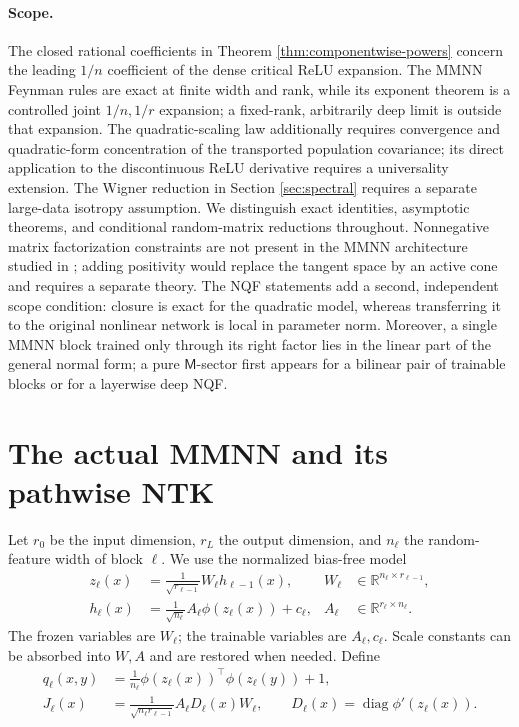 \documentclass{article}
\newcommand{\R}{\mathbb R}
\newcommand{\diag}{\operatorname{diag}}
\begin{document}
\paragraph{Scope.}
The closed rational coefficients in Theorem
\ref{thm:componentwise-powers} concern the leading \(1/n\) coefficient of
the dense critical ReLU expansion.  The MMNN Feynman rules are exact at
finite width and rank, while its exponent theorem is a controlled joint
\(1/n,1/r\) expansion; a fixed-rank, arbitrarily deep limit is outside that
expansion.  The quadratic-scaling law additionally requires convergence and
quadratic-form concentration of the transported population covariance; its
direct application to the discontinuous ReLU derivative requires a
universality extension.  The Wigner reduction in Section \ref{sec:spectral}
requires a separate large-data isotropy assumption.  We distinguish exact
identities, asymptotic theorems, and conditional random-matrix reductions
throughout.  Nonnegative matrix factorization constraints are not present in
the MMNN architecture studied in \citep{MMNN2024}; adding positivity would
replace the tangent space by an active cone and requires a separate theory.
The NQF statements add a second, independent scope condition: closure is
exact for the quadratic model, whereas transferring it to the original
nonlinear network is local in parameter norm.  Moreover, a single MMNN block
trained only through its right factor lies in the linear part of the general
normal form; a pure \(\mathsf M\)-sector first appears for a bilinear pair of
trainable blocks or for a layerwise deep NQF.

\section{The actual MMNN and its pathwise NTK}
\label{sec:mmnn}

Let \(r_0\) be the input dimension, \(r_L\) the output dimension, and
\(n_\ell\) the random-feature width of block \(\ell\).  We use the normalized
bias-free model
\begin{align}
z_\ell(x)&=\frac{1}{\sqrt{r_{\ell-1}}}W_\ell h_{\ell-1}(x),
&W_\ell&\in\R^{n_\ell\times r_{\ell-1}},\label{eq:mmnn-z}\\
h_\ell(x)&=\frac{1}{\sqrt{n_\ell}}A_\ell\phi(z_\ell(x))+c_\ell,
&A_\ell&\in\R^{r_\ell\times n_\ell}.
\label{eq:mmnn-h}
\end{align}
The frozen variables are \(W_\ell\); the trainable variables are
\(A_\ell,c_\ell\).  Scale constants can be absorbed into \(W,A\) and are
restored when needed.  Define
\begin{align}
q_\ell(x,y)&=\frac1{n_\ell}
\phi(z_\ell(x))^\top\phi(z_\ell(y))+1,\label{eq:q-direct}\\
J_\ell(x)&=\frac{1}{\sqrt{n_\ell r_{\ell-1}}}
A_\ell D_\ell(x)W_\ell,
\qquad D_\ell(x)=\diag\phi'(z_\ell(x)).\label{eq:mmnn-J}
\end{align}
\end{document}
